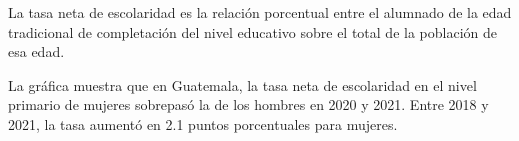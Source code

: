 La tasa neta de escolaridad es la relación porcentual entre el alumnado de la edad tradicional de completación del nivel educativo sobre el total de la población de esa edad.

La gráfica muestra que en Guatemala, la tasa neta de escolaridad en el nivel primario de mujeres sobrepasó la de los hombres en 2020 y 2021. Entre 2018 y 2021, la tasa aumentó en 2.1 puntos porcentuales para mujeres.